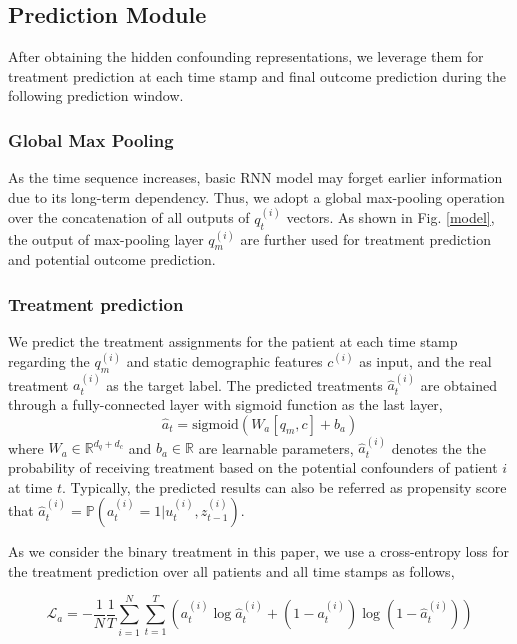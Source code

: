 
\subsection{Prediction Module}
After obtaining the hidden confounding representations, we leverage them for treatment prediction at each time stamp and final outcome prediction during the following prediction window.

\subsubsection{Global Max Pooling}
As the time sequence increases, basic RNN model may forget earlier information due to its long-term dependency. Thus, we adopt a global max-pooling operation over the concatenation of all outputs of $q^{(i)}_t$ vectors. As shown in Fig. \ref{model}, the output of max-pooling layer $q^{(i)}_m$ are further used for treatment prediction and potential outcome prediction.

\subsubsection{Treatment prediction}
We predict the treatment assignments for the patient at each time stamp regarding the $q^{(i)}_m$ and static demographic features $c^{(i)}$ as input, and the real treatment $a^{(i)}_t$ as the target label. The predicted treatments $\hat{a}^{(i)}_t$ are obtained through a fully-connected layer with sigmoid function as the last layer,
\begin{equation}
\label{eq:pred_a}
\hat{a}_t = \text{sigmoid}(W_{a}[q_{m},c]+b_{a})
\end{equation}
where $W_{a}\in\mathbb{R}^{d_{q}+d_{c}}$ and $b_{a}\in\mathbb{R}$ are learnable parameters, $\hat{a}^{(i)}_t$ denotes the the probability of receiving treatment based on the potential confounders of patient $i$ at time $t$. Typically, the predicted results can also be referred as propensity score \cite{rosenbaum1983central} that $\hat{a}^{(i)}_t=\mathbb{P}(a^{(i)}_{t}=1|u^{(i)}_{t},z^{(i)}_{t-1})$.

As we consider the binary treatment in this paper, we use a cross-entropy loss for the treatment prediction over all patients and all time stamps as follows,
\begin{small}
\begin{equation}
\label{eq:treatment-pred-loss}
    \mathcal{L}_a=-\frac{1}{N}\frac{1}{T}\sum_{i=1}^{N}\sum_{t=1}^{T}(a^{(i)}_t\log{\hat{a}^{(i)}_t}+(1-a^{(i)}_t)\log{(1-\hat{a}^{(i)}_t)})
\end{equation}
\end{small}

